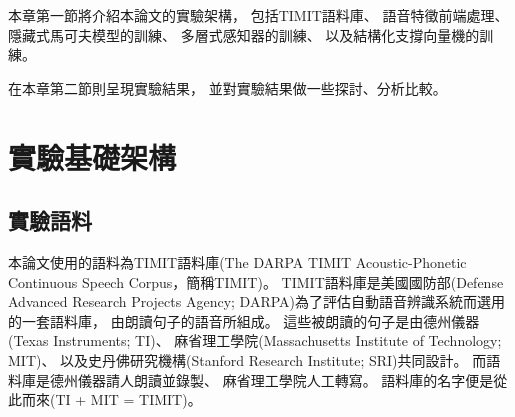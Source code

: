 本章第一節將介紹本論文的實驗架構，
包括TIMIT語料庫、
語音特徵前端處理、
隱藏式馬可夫模型的訓練、
多層式感知器的訓練、
以及結構化支撐向量機的訓練。

在本章第二節則呈現實驗結果，
並對實驗結果做一些探討、分析比較。

\section{實驗基礎架構}
  \subsection{實驗語料}
  \label{subsec:corpus_setting}
  本論文使用的語料為TIMIT語料庫(The DARPA TIMIT Acoustic-Phonetic Continuous Speech Corpus，簡稱TIMIT)。
  TIMIT語料庫是美國國防部(Defense Advanced Research Projects Agency; DARPA)為了評估自動語音辨識系統而選用的一套語料庫，
  由朗讀句子的語音所組成。
  這些被朗讀的句子是由德州儀器(Texas Instruments; TI)、
  麻省理工學院(Massachusetts Institute of Technology; MIT)、
  以及史丹佛研究機構(Stanford Research Institute; SRI)共同設計。
  而語料庫是德州儀器請人朗讀並錄製、
  麻省理工學院人工轉寫。
  語料庫的名字便是從此而來(TI + MIT = TIMIT)。

